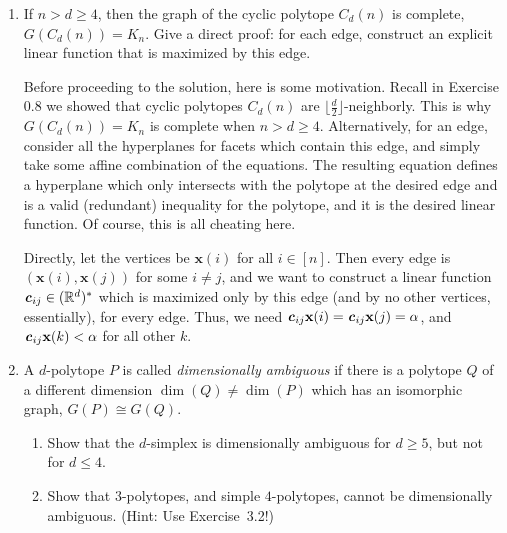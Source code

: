 \documentclass{article}
\begin{document}
\begin{enumerate}
\begin{solution}
    \begin{remark}
        In fact, a $d$-dimensional polytope $P$ cannot contain subdivisions of complete graphs with more than $d+1$ vertices. 
    \end{remark}
\end{solution}

\item If $n > d \ge 4$, then the graph of the cyclic polytope $C_d(n)$ is complete, $G(C_d(n)) = K_n$. Give a direct proof: for each edge, construct an explicit linear function that is maximized by this edge.

\begin{solution}
    Before proceeding to the solution, here is some motivation. Recall in Exercise 0.8 we showed that cyclic polytopes $C_d(n)$ are $\lfloor \frac{d}{2} \rfloor$-neighborly. This is why $G(C_d(n)) = K_n$ is complete when $n > d \ge 4$. Alternatively, for an edge, consider all the hyperplanes for facets which contain this edge, and simply take some affine combination of the equations. The resulting equation defines a hyperplane which only intersects with the polytope at the desired edge and is a valid (redundant) inequality for the polytope, and it is the desired linear function. Of course, this is all cheating here.
    
    Directly, let the vertices be $\textbf{x}(i)$ for all $i\in [n]$. Then every edge is $(\textbf{x}(i), \textbf{x}(j))$ for some $i\neq j$, and we want to construct a linear function $\textbf{\textit{c}}_{ij} \in (\mathbb{R}^d)^*$ which is maximized only by this edge (and by no other vertices, essentially), for every edge. Thus, we need $\textbf{\textit{c}}_{ij}\textbf{x}(i) = \textbf{\textit{c}}_{ij}\textbf{x}(j) = \alpha$, and $\textbf{\textit{c}}_{ij}\textbf{x}(k) < \alpha$ for all other $k$.

\end{solution}

\item A $d$-polytope $P$ is called \emph{dimensionally ambiguous} if there is a polytope $Q$ of a different dimension $\dim(Q) \neq \dim(P)$ which has an isomorphic graph, $G(P) \cong G(Q)$.

\begin{enumerate}[label=(\roman*)]
\item Show that the $d$-simplex is dimensionally ambiguous for $d \ge 5$, but not for $d \le 4$.

\item Show that $3$-polytopes, and simple $4$-polytopes, cannot be dimensionally ambiguous. (Hint: Use Exercise~3.2!)


\end{enumerate}
\end{enumerate}
\end{document}
